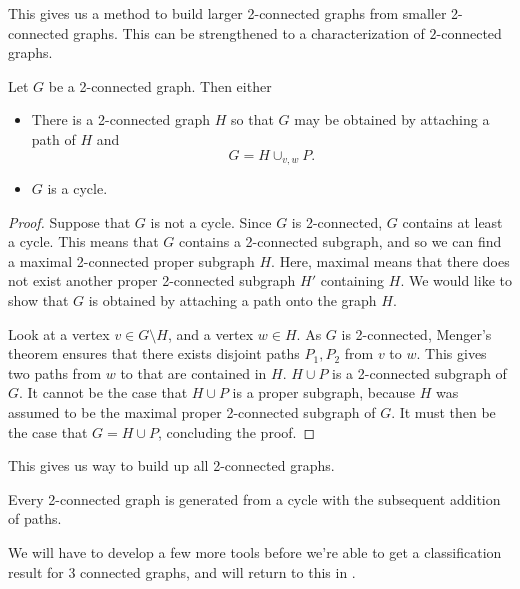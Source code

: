 
This gives us a method to build larger 2-connected graphs from smaller 2-connected graphs.
This can be strengthened to a characterization of $2$-connected graphs. 
\begin{theorem}
	Let $G$ be a 2-connected graph. Then either 
		\begin{itemize}
			\item 
			There is a 2-connected graph $H$ so that $G$ may be obtained by attaching a path of $H$ and
			\[G=H\cup_{v,w} P.\]
			\item 
			$G$ is a cycle.
		\end{itemize} 
\end{theorem}
\begin{proof}
	Suppose that $G$ is not a cycle.
	Since $G$ is 2-connected, $G$ contains at least a cycle.
	This means that $G$ contains a 2-connected subgraph, and so we can find a maximal 2-connected proper subgraph $H$. 
	Here, maximal means that there does not exist another proper 2-connected subgraph $H'$ containing $H$. 
	We would like to show that $G$ is obtained by attaching a path onto the graph $H$. 


	Look at a vertex $v\in G\setminus H$, and a vertex $w\in H$.
	As $G$ is 2-connected,  Menger's theorem ensures that there exists disjoint paths $P_1, P_2$ from $v$ to $w$.
	This gives two paths from $w$ to that are contained in $H$.
	$H\cup P$ is a 2-connected subgraph of $G$.
	It cannot be the case that $H\cup P$ is a proper subgraph, because $H$ was assumed to be the maximal proper 2-connected subgraph of $G$.
	It must then be the case that $G=H\cup P$, concluding the proof. 
\end{proof}
This gives us way to build up all 2-connected graphs. 
\begin{corollary}
	Every 2-connected graph is generated from a cycle with the subsequent addition of paths.
\end{corollary}
We will have to develop a few more tools before we're able to get  a classification result for 3 connected graphs, and will return to this in .

